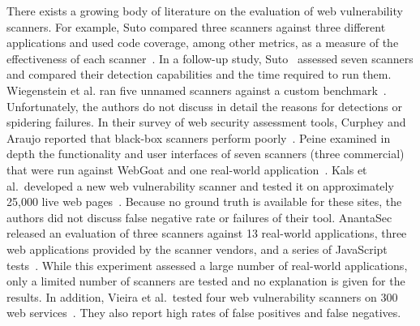  There exists a
growing body of literature on the evaluation of web vulnerability
scanners. For example, Suto compared three scanners against three
different applications and used code coverage, among other metrics, as
a measure of the effectiveness of each scanner~\cite{suto07}. In a
follow-up study, Suto~\cite{suto10:webscanners} assessed seven
scanners and compared their detection capabilities and the time
required to run them. Wiegenstein et al. ran five unnamed scanners
against a custom benchmark~\cite{wiegenstein06}. Unfortunately, the
authors do not discuss in detail the reasons for detections or
spidering failures. In their survey of web security assessment tools,
Curphey and Araujo reported that black-box scanners perform
poorly~\cite{curphey06}. Peine examined in depth the functionality and
user interfaces of seven scanners (three commercial) that were run
against WebGoat and one real-world application~\cite{peine06}. Kals et
al.\ developed a new web vulnerability scanner and tested it on
approximately 25,000 live web pages~\cite{kals06:secubat}. Because no
ground truth is available for these sites, the authors did not discuss
false negative rate or failures of their tool. AnantaSec released an
evaluation of three scanners against 13 real-world applications, three
web applications provided by the scanner vendors, and a series of
JavaScript tests~\cite{anantasec09}. While this experiment assessed a
large number of real-world applications, only a limited number of
scanners are tested and no explanation is given for the results. In
addition, Vieira et al.\ tested four web vulnerability scanners on 300
web services~\cite{vieira09}. They also report high rates of false
positives and false negatives.




